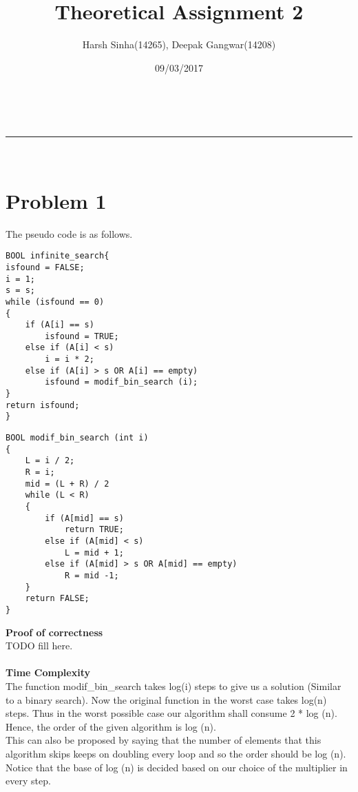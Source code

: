 \documentclass[a4paper,11pt]{article}
\makeatletter
\newcommand{\linia}{\rule{\linewidth}{0.5pt}}
\theoremstyle{mytheor}
\renewcommand{\maketitle}{
\begin{center}
\vspace{2ex}
{\huge \textsc{\@title}}
\vspace{1ex}
\\
\linia\\
\@author \hfill \@date
\vspace{4ex}
\end{center}
}
\makeatother
\begin{document}
\title{Theoretical Assignment \textnumero{} 2}

\author{Harsh Sinha(14265), Deepak Gangwar(14208)}

\date{09/03/2017}

\maketitle

\section*{Problem 1}

The pseudo code is as follows.

\begin{lstlisting}[label={list:first},caption=Pseudo code -- Search in an Infinite Array.]
BOOL infinite_search{
isfound = FALSE;
i = 1;
s = s;
while (isfound == 0)
{
	if (A[i] == s)
		isfound = TRUE;
	else if (A[i] < s)
		i = i * 2;
	else if (A[i] > s OR A[i] == empty)
		isfound = modif_bin_search (i);
}
return isfound;
}
\end{lstlisting}

\begin{lstlisting}[caption=modif\_bin\_search.]
BOOL modif_bin_search (int i)
{
	L = i / 2;
	R = i;
	mid = (L + R) / 2
	while (L < R)
	{
		if (A[mid] == s)
			return TRUE;
		else if (A[mid] < s)
			L = mid + 1;
		else if (A[mid] > s OR A[mid] == empty)
			R = mid -1;	
	}
	return FALSE;
}
\end{lstlisting}

\textbf{Proof of correctness}\\
TODO fill here.\\
\\

\textbf{Time Complexity}\\
The function modif\_bin\_search takes log(i) steps to give us a solution (Similar to a binary search). Now the original function in the worst case takes log(n) steps. Thus in the worst possible case our algorithm shall consume 2 * log (n). Hence, the order of the given algorithm is log (n).\\
This can also be proposed by saying that the number of elements that this algorithm skips keeps on doubling every loop and so the order should be log (n).\\
Notice that the base of log (n) is decided based on our choice of the multiplier in every step.
\end{document}
